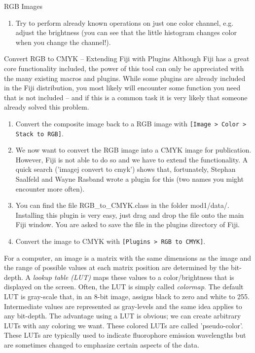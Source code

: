 \begin{taskbox}{RGB Images}
\begin{enumerate}
	\item Try to perform already known operations on just one color channel, e.g. adjust the brightness (you can see that the little histogram changes color when you change the channel!).
\end{enumerate}

\end{taskbox}

\newpage
\begin{taskbox}{Convert RGB to CMYK -- Extending Fiji with Plugins}
Although Fiji has a great core functionality included, the power of this tool can only be appreciated with the many existing macros and plugins. While some plugins are already included in the Fiji distribution, you most likely will encounter some function you need that is not included -- and if this is a common task it is very likely that someone already solved this problem. 

\begin{enumerate}
	\item Convert the composite image back to a RGB image with \texttt{[Image > Color > Stack to RGB]}.
	\item We now want to convert the RGB image into a CMYK image for publication. However, Fiji is not able to do so and we have to extend the functionality. A quick search ('imagej convert to cmyk') shows that, fortunately, Stephan Saalfeld and Wayne Rasband wrote a plugin for this (two names you might encounter more often).
	\item You can find the file RGB\_to\_CMYK.class in the folder mod1/data/. Installing this plugin is very easy, just drag and drop the file onto the main Fiji window. You are asked to save the file in the plugins directory of Fiji. 
	\item Convert the image to CMYK with \texttt{[Plugins > RGB to CMYK]}.
\end{enumerate}

\end{taskbox}

For a computer, an image is a matrix with the same dimensions as the image and the range of possible values at each matrix position are determined by the bit-depth. A \emph{lookup table (LUT)} maps these values to a color/brightness that is displayed on the screen. Often, the LUT is simply called \emph{colormap}. The default LUT is gray-scale that, in an 8-bit image, assigns black to zero and white to 255. Intermediate values are represented as gray-levels and the same idea applies to any bit-depth.
The advantage using a LUT is obvious; we can create arbitrary LUTs with any coloring we want. These colored LUTs are called 'pseudo-color'. These LUTs are typically used to indicate fluorophore emission wavelengths but are sometimes changed to emphasize certain aspects of the data.

